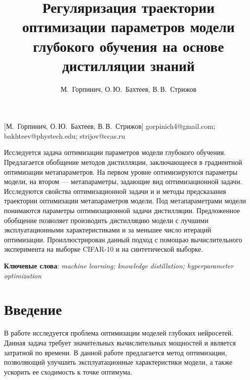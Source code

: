 \documentclass[12pt, twoside]{article}
\begin{document}
\title
    [Оптимизация параметров модели на основе дистилляции знаний] %
    {Регуляризация траектории оптимизации параметров модели глубокого обучения на основе дистилляции знаний}
\author
    [М.~Горпинич] %
    {М.~Горпинич, О.\,Ю.~Бахтеев, В.\,В.~Стрижов} %
    [М.~Горпинич, О.\,Ю.~Бахтеев, В.\,В.~Стрижов] %
\email
    {gorpinich4@gmail.com; bakhteev@phystech.edu;  strijov@ccas.ru}
\abstract
    {Исследуется задача оптимизации параметров модели глубокого обучения. Предлагается обобщение методов дистилляции, заключающееся в градиентной оптимизации метапараметров. На первом уровне оптимизируются параметры модели, на втором --- метапараметры, задающие вид оптимизационной задачи. Исследуются свойства оптимизационной задачи и и методы предсказания траектории оптимизации метапараметров модели. Под метапараметрами модели понимаются параметры оптимизационной задачи дистилляции. Предложенное обобщение позволяет производить дистилляцию модели с лучшими эксплуатационными характеристиками и за меньшее число итераций оптимизации. Проиллюстрирован данный подход с помощью вычислительного эксперимента на выборке CIFAR-10 и на синтетической выборке.
	
\bigskip
\noindent
\textbf{Ключевые слова}: \emph {machine learning; knowledge distillation; hyperparameter optimization}
}

\doi{}
\receivedRus{}
\receivedEng{}

\maketitle
\linenumbers

\section{Введение}
В работе исследуется проблема оптимизации моделей глубоких нейросетей. Данная задача требует значительных вычислительных мощностей и является затратной по времени. В данной работе предлагается метод оптимизации, позволяющий улучшить эксплуатационные характеристики модели, а также ускорить ее сходимость к точке оптимума.
\end{document}
